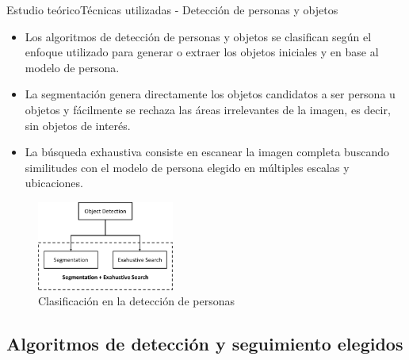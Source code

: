
\begin{frame}{Estudio teórico}{Técnicas utilizadas - Detección de personas y objetos}

\begin{itemize}
    \justifying
    \item Los algoritmos de detección de personas y objetos se clasifican según el enfoque utilizado para generar o extraer los objetos iniciales y en base al modelo de persona.
    \item La segmentación genera directamente los objetos candidatos a ser persona u objetos y fácilmente se rechaza las áreas irrelevantes de la imagen, es decir, sin objetos de interés.
    \item La búsqueda exhaustiva consiste en escanear la imagen completa buscando similitudes con el modelo de persona elegido en múltiples escalas y ubicaciones.
\end{itemize}

\begin{figure}[ht]
\centering
\includegraphics[width=0.4\textwidth]{Images/estudio-teorico/people-detection-classification.png}
\caption{\label{fig:people-detection-classification}Clasificación en la detección de personas}
\end{figure}

\end{frame}


\subsection{Algoritmos de detección y seguimiento elegidos}

